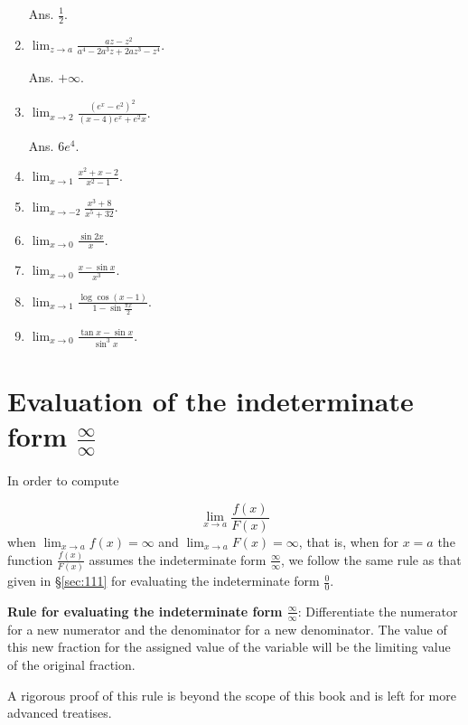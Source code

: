 \begin{enumerate}
Ans. $\frac{1}{2}$.

\item
$\lim_{z \to a} \frac{az - z^2}{a^4 - 2a^3z + 2 az^3 - z^4}$. 

Ans. $+\infty$.

\item
$\lim_{x \to 2} \frac{(e^x - e^2)^2}{(x - 4)e^x + e^2 x}$. 	  

Ans. $6e^4$.

\item
$\lim_{x \to 1} \frac{x^2 + x - 2}{x^2 - 1}$.

\item
$\lim_{x \to -2} \frac{x^3 + 8}{x^5 + 32}$.

\item
$\lim_{x \to 0} \frac{\sin 2x}{x}$.

\item
$\lim_{x \to 0} \frac{x - \sin x}{x^3}$.

\item
$\lim_{x \to 1} \frac{\log \cos (x - 1)}{1 - \sin \frac{\pi x}{2}}$.

\item
$\lim_{x \to 0} \frac{\tan x - \sin x}{\sin^3 x}$.

\end{enumerate}

\section{Evaluation of the indeterminate form $\frac{\infty}{\infty}$}
\label{sec:112}

In order to compute

\[
  	\lim_{x \to a} \frac{f(x)}{F(x)}
\]
when $	\lim_{x \to a} f(x) = \infty$ and $\lim_{x \to a} F(x) = \infty$,
that is, when for $x = a$ the function $\frac{f(x)}{F(x)}$
assumes the indeterminate form $\frac{\infty}{\infty}$,
we follow the same rule as that given in \S \ref{sec:111} for 
evaluating the indeterminate form $\frac{0}{0}$. 

{\bf Rule for evaluating the indeterminate form $\frac{\infty}{\infty}$}:
Differentiate the numerator for a new numerator and the denominator 
for a new denominator. The value of this new fraction for the assigned 
value of the variable will be the limiting value of the original fraction.

A rigorous proof of this rule is beyond the scope of this book and is left 
for more advanced treatises.

